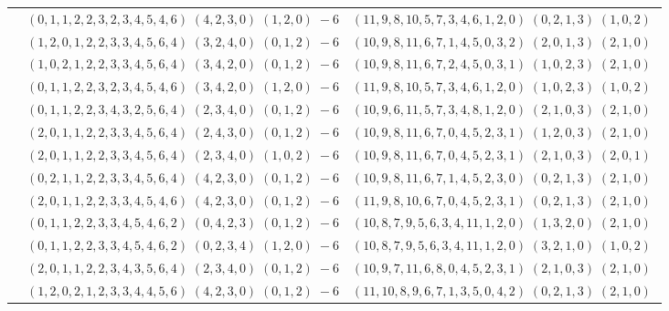 \documentclass[11pt]{article}
\begin{document}
\begin{longtable}[l]{|c|c|c|}
 \cline{2-3} 
 & $(0 ,1 ,1 ,2 ,2 ,3 ,2 ,3 ,4 ,5 ,4 ,6) \;(4 ,2 ,3 ,0) \;(1 ,2 ,0) \;-6$ & $(11 ,9 ,8 ,10 ,5 ,7 ,3 ,4 ,6 ,1 ,2 ,0) \;(0 ,2 ,1 ,3) \;(1 ,0 ,2) \;$\\ 
 \cline{2-3} 
 & $(1 ,2 ,0 ,1 ,2 ,2 ,3 ,3 ,4 ,5 ,6 ,4) \;(3 ,2 ,4 ,0) \;(0 ,1 ,2) \;-6$ & $(10 ,9 ,8 ,11 ,6 ,7 ,1 ,4 ,5 ,0 ,3 ,2) \;(2 ,0 ,1 ,3) \;(2 ,1 ,0) \;$\\ 
 \cline{2-3} 
 & $(1 ,0 ,2 ,1 ,2 ,2 ,3 ,3 ,4 ,5 ,6 ,4) \;(3 ,4 ,2 ,0) \;(0 ,1 ,2) \;-6$ & $(10 ,9 ,8 ,11 ,6 ,7 ,2 ,4 ,5 ,0 ,3 ,1) \;(1 ,0 ,2 ,3) \;(2 ,1 ,0) \;$\\ 
 \cline{2-3} 
 & $(0 ,1 ,1 ,2 ,2 ,3 ,2 ,3 ,4 ,5 ,4 ,6) \;(3 ,4 ,2 ,0) \;(1 ,2 ,0) \;-6$ & $(11 ,9 ,8 ,10 ,5 ,7 ,3 ,4 ,6 ,1 ,2 ,0) \;(1 ,0 ,2 ,3) \;(1 ,0 ,2) \;$\\ 
 \cline{2-3} 
 & $(0 ,1 ,1 ,2 ,2 ,3 ,4 ,3 ,2 ,5 ,6 ,4) \;(2 ,3 ,4 ,0) \;(0 ,1 ,2) \;-6$ & $(10 ,9 ,6 ,11 ,5 ,7 ,3 ,4 ,8 ,1 ,2 ,0) \;(2 ,1 ,0 ,3) \;(2 ,1 ,0) \;$\\ 
 \cline{2-3} 
 & $(2 ,0 ,1 ,1 ,2 ,2 ,3 ,3 ,4 ,5 ,6 ,4) \;(2 ,4 ,3 ,0) \;(0 ,1 ,2) \;-6$ & $(10 ,9 ,8 ,11 ,6 ,7 ,0 ,4 ,5 ,2 ,3 ,1) \;(1 ,2 ,0 ,3) \;(2 ,1 ,0) \;$\\ 
 \cline{2-3} 
 & $(2 ,0 ,1 ,1 ,2 ,2 ,3 ,3 ,4 ,5 ,6 ,4) \;(2 ,3 ,4 ,0) \;(1 ,0 ,2) \;-6$ & $(10 ,9 ,8 ,11 ,6 ,7 ,0 ,4 ,5 ,2 ,3 ,1) \;(2 ,1 ,0 ,3) \;(2 ,0 ,1) \;$\\ 
 \cline{2-3} 
 & $(0 ,2 ,1 ,1 ,2 ,2 ,3 ,3 ,4 ,5 ,6 ,4) \;(4 ,2 ,3 ,0) \;(0 ,1 ,2) \;-6$ & $(10 ,9 ,8 ,11 ,6 ,7 ,1 ,4 ,5 ,2 ,3 ,0) \;(0 ,2 ,1 ,3) \;(2 ,1 ,0) \;$\\ 
 \cline{2-3} 
 & $(2 ,0 ,1 ,1 ,2 ,2 ,3 ,3 ,4 ,5 ,4 ,6) \;(4 ,2 ,3 ,0) \;(0 ,1 ,2) \;-6$ & $(11 ,9 ,8 ,10 ,6 ,7 ,0 ,4 ,5 ,2 ,3 ,1) \;(0 ,2 ,1 ,3) \;(2 ,1 ,0) \;$\\ 
 \cline{2-3} 
 & $(0 ,1 ,1 ,2 ,2 ,3 ,3 ,4 ,5 ,4 ,6 ,2) \;(0 ,4 ,2 ,3) \;(0 ,1 ,2) \;-6$ & $(10 ,8 ,7 ,9 ,5 ,6 ,3 ,4 ,11 ,1 ,2 ,0) \;(1 ,3 ,2 ,0) \;(2 ,1 ,0) \;$\\ 
 \cline{2-3} 
 & $(0 ,1 ,1 ,2 ,2 ,3 ,3 ,4 ,5 ,4 ,6 ,2) \;(0 ,2 ,3 ,4) \;(1 ,2 ,0) \;-6$ & $(10 ,8 ,7 ,9 ,5 ,6 ,3 ,4 ,11 ,1 ,2 ,0) \;(3 ,2 ,1 ,0) \;(1 ,0 ,2) \;$\\ 
 \cline{2-3} 
 & $(2 ,0 ,1 ,1 ,2 ,2 ,3 ,4 ,3 ,5 ,6 ,4) \;(2 ,3 ,4 ,0) \;(0 ,1 ,2) \;-6$ & $(10 ,9 ,7 ,11 ,6 ,8 ,0 ,4 ,5 ,2 ,3 ,1) \;(2 ,1 ,0 ,3) \;(2 ,1 ,0) \;$\\ 
 \cline{2-3} 
 & $(1 ,2 ,0 ,2 ,1 ,2 ,3 ,3 ,4 ,4 ,5 ,6) \;(4 ,2 ,3 ,0) \;(0 ,1 ,2) \;-6$ & $(11 ,10 ,8 ,9 ,6 ,7 ,1 ,3 ,5 ,0 ,4 ,2) \;(0 ,2 ,1 ,3) \;(2 ,1 ,0) \;$\\ 

\end{longtable}
\end{document}
